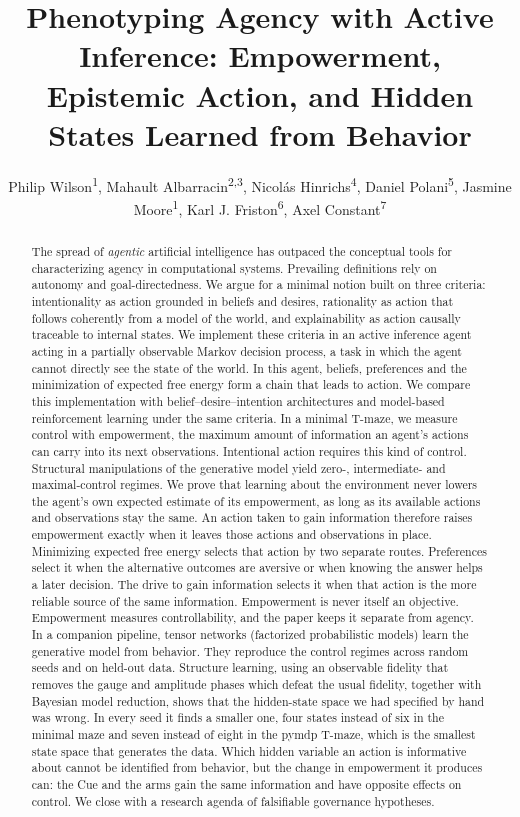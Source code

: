 \documentclass[letterpaper]{article} %
\title{Phenotyping Agency with Active Inference: Empowerment, Epistemic Action, and Hidden States Learned from Behavior}
\author{
    Philip Wilson\textsuperscript{\rm 1},
    Mahault Albarracin\textsuperscript{\rm 2,\rm 3},
    Nicol\'{a}s Hinrichs\textsuperscript{\rm 4},
    Daniel Polani\textsuperscript{\rm 5},
    Jasmine Moore\textsuperscript{\rm 1},
    Karl J. Friston\textsuperscript{\rm 6},
    Axel Constant\textsuperscript{\rm 7}\corresponding
}
\theoremstyle{definition}
\begin{document}
\maketitle

\begin{abstract}
The spread of \emph{agentic} artificial intelligence has outpaced the conceptual tools for characterizing agency in computational systems. Prevailing definitions rely on autonomy and goal-directedness. We argue for a minimal notion built on three criteria: intentionality as action grounded in beliefs and desires, rationality as action that follows coherently from a model of the world, and explainability as action causally traceable to internal states. We implement these criteria in an active inference agent acting in a partially observable Markov decision process, a task in which the agent cannot directly see the state of the world. In this agent, beliefs, preferences and the minimization of expected free energy form a chain that leads to action. We compare this implementation with belief--desire--intention architectures and model-based reinforcement learning under the same criteria. In a minimal T-maze, we measure control with empowerment, the maximum amount of information an agent's actions can carry into its next observations. Intentional action requires this kind of control. Structural manipulations of the generative model yield zero-, intermediate- and maximal-control regimes. We prove that learning about the environment never lowers the agent's own expected estimate of its empowerment, as long as its available actions and observations stay the same. An action taken to gain information therefore raises empowerment exactly when it leaves those actions and observations in place. Minimizing expected free energy selects that action by two separate routes. Preferences select it when the alternative outcomes are aversive or when knowing the answer helps a later decision. The drive to gain information selects it when that action is the more reliable source of the same information. Empowerment is never itself an objective. Empowerment measures controllability, and the paper keeps it separate from agency. In a companion pipeline, tensor networks (factorized probabilistic models) learn the generative model from behavior. They reproduce the control regimes across random seeds and on held-out data. Structure learning, using an observable fidelity that removes the gauge and amplitude phases which defeat the usual fidelity, together with Bayesian model reduction, shows that the hidden-state space we had specified by hand was wrong. In every seed it finds a smaller one, four states instead of six in the minimal maze and seven instead of eight in the pymdp T-maze, which is the smallest state space that generates the data. Which hidden variable an action is informative about cannot be identified from behavior, but the change in empowerment it produces can: the Cue and the arms gain the same information and have opposite effects on control. We close with a research agenda of falsifiable governance hypotheses.
\end{abstract}
\end{document}

